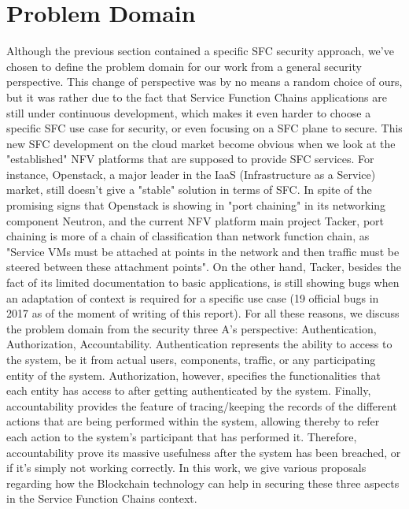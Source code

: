 \section{Problem Domain}
Although the previous section contained a specific SFC security approach, we've chosen to define the problem domain for our work from a general security perspective. This change of perspective was by no means a random choice of ours, but it was rather due to the fact that Service Function Chains applications are still under continuous development, which makes it even harder to choose a specific SFC use case for security, or even focusing on a SFC plane to secure. This new SFC development on the cloud market become obvious when we look at the "established" NFV platforms that are supposed to provide SFC services. For instance, Openstack, a major leader in the IaaS (Infrastructure as a Service) market, still doesn't give a "stable" solution in terms of SFC. In spite of the promising signs that Openstack is showing in "port chaining" in its networking component Neutron, and the current NFV platform main project Tacker, port chaining is more of a chain of classification than network function chain, as "Service VMs must be attached at points in the network and then traffic must be steered between these attachment points". On the other hand, Tacker, besides the fact of its limited documentation to basic applications, is still showing bugs when an adaptation of context is required for a specific use case (19 official bugs in 2017 as of the moment of writing of this report)\cite{bugs}. For all these reasons, we discuss the problem domain from the security three A's perspective: Authentication, Authorization, Accountability.  Authentication represents the ability to access  to the system, be it from actual users, components, traffic, or any participating entity of the system.  Authorization, however, specifies the functionalities that each entity has access to after getting authenticated by the system. Finally, accountability provides the feature of tracing/keeping the records of the different actions that are being performed within the system, allowing thereby to refer each action to the system's participant that has performed it. Therefore, accountability prove its massive usefulness after the system has been breached, or if it's simply not working correctly. In this work, we give various proposals regarding how the Blockchain technology can help in securing these three aspects in the Service Function Chains context. 
